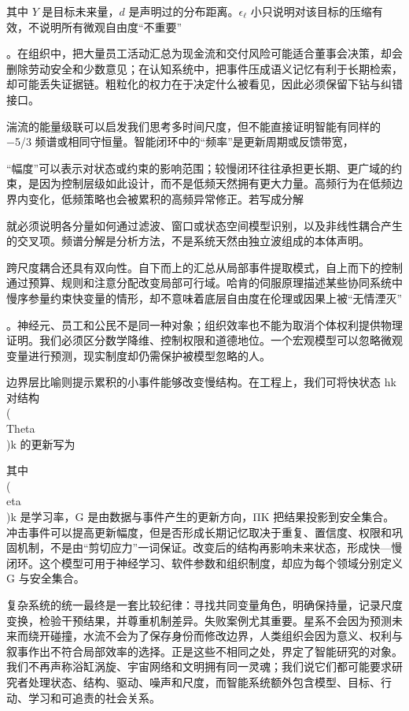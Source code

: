 其中 $Y$ 是目标未来量，$d$ 是声明过的分布距离。$\epsilon_\ell$ 小只说明对该目标的压缩有效，不说明所有微观自由度“不重要”

。在组织中，把大量员工活动汇总为现金流和交付风险可能适合董事会决策，却会删除劳动安全和少数意见；在认知系统中，把事件压成语义记忆有利于长期检索，却可能丢失证据链。粗粒化的权力在于决定什么被看见，因此必须保留下钻与纠错接口。

湍流的能量级联可以启发我们思考多时间尺度，但不能直接证明智能有同样的 −5/3 频谱或相同守恒量。智能闭环中的“频率”是更新周期或反馈带宽，

“幅度”可以表示对状态或约束的影响范围；较慢闭环往往承担更长期、更广域的约束，是因为控制层级如此设计，而不是低频天然拥有更大力量。高频行为在低频边界内变化，低频策略也会被累积的高频异常修正。若写成分解

就必须说明各分量如何通过滤波、窗口或状态空间模型识别，以及非线性耦合产生的交叉项。频谱分解是分析方法，不是系统天然由独立波组成的本体声明。

跨尺度耦合还具有双向性。自下而上的汇总从局部事件提取模式，自上而下的控制通过预算、规则和注意分配改变局部可行域。哈肯的伺服原理描述某些协同系统中慢序参量约束快变量的情形，却不意味着底层自由度在伦理或因果上被“无情湮灭”

。神经元、员工和公民不是同一种对象；组织效率也不能为取消个体权利提供物理证明。我们必须区分数学降维、控制权限和道德地位。一个宏观模型可以忽略微观变量进行预测，现实制度却仍需保护被模型忽略的人。

边界层比喻则提示累积的小事件能够改变慢结构。在工程上，我们可将快状态 hk 对结构 \\(\\Theta\\)k 的更新写为

其中 \\(\\eta\\)k 是学习率，G 是由数据与事件产生的更新方向，ΠK 把结果投影到安全集合。冲击事件可以提高更新幅度，但是否形成长期记忆取决于重复、置信度、权限和巩固机制，不是由“剪切应力”一词保证。改变后的结构再影响未来状态，形成快—慢闭环。这个模型可用于神经学习、软件参数和组织制度，却应为每个领域分别定义 G 与安全集合。

复杂系统的统一最终是一套比较纪律：寻找共同变量角色，明确保持量，记录尺度变换，检验干预结果，并尊重机制差异。失败案例尤其重要。星系不会因为预测未来而绕开碰撞，水流不会为了保存身份而修改边界，人类组织会因为意义、权利与叙事作出不符合局部效率的选择。正是这些不相同之处，界定了智能研究的对象。我们不再声称浴缸涡旋、宇宙网络和文明拥有同一灵魂；我们说它们都可能要求研究者处理状态、结构、驱动、噪声和尺度，而智能系统额外包含模型、目标、行动、学习和可追责的社会关系。

